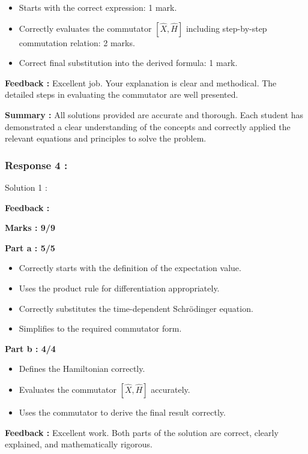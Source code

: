 \documentclass[a4paper,11pt]{article}
\begin{document}
\begin{itemize}
    \item Starts with the correct expression: 1 mark.
    \item Correctly evaluates the commutator $[\hat{X}, \hat{H}]$ including step-by-step commutation relation: 2 marks.
    \item Correct final substitution into the derived formula: 1 mark.
\end{itemize}

\textbf{Feedback :}
Excellent job. Your explanation is clear and methodical. The detailed steps in evaluating the commutator are well presented.

\textbf{Summary :}
All solutions provided are accurate and thorough. Each student has demonstrated a clear understanding of the concepts and correctly applied the relevant equations and principles to solve the problem.




\subsubsection*{Response 4 :}


Solution 1 :

\textbf{Feedback :}

\textbf{Marks : 9/9}

\textbf{Part a : 5/5}

\begin{itemize}
    \item Correctly starts with the definition of the expectation value.
    \item Uses the product rule for differentiation appropriately.
    \item Correctly substitutes the time-dependent Schrödinger equation.
    \item Simplifies to the required commutator form.
\end{itemize}


\textbf{Part b : 4/4}

\begin{itemize}
    \item Defines the Hamiltonian correctly.
    \item Evaluates the commutator $[\hat{X}, \hat{H}]$ accurately.
    \item Uses the commutator to derive the final result correctly.
\end{itemize}

\textbf{Feedback :}
Excellent work. Both parts of the solution are correct, clearly explained, and mathematically rigorous.
\end{document}
